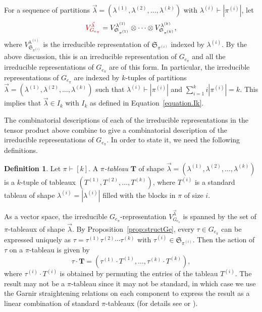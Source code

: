 \documentclass[10pt]{amsart}
\theoremstyle{definition}
\newtheorem{definition}[theorem]{Definition}
\theoremstyle{remark}
\newcommand{\defncolor}{\color{darkred}}
\newcommand{\defn}[1]{{\defncolor\emph{#1}}} %
\begin{document}
For a sequence of partitions
$\vec{\lambda} = (\lambda^{(1)}, \lambda^{(2)}, \ldots, \lambda^{(k)})$
with $\lambda^{(i)} \vdash |\pi^{(i)}|$,
let
\begin{equation*}
    {\defncolor V_{G_{e_\pi}}^{\vec{\lambda}}} =
    V_{\mathfrak{S}_{\pi^{(1)}}}^{\lambda^{(1)}}
    \otimes \cdots \otimes
    V_{\mathfrak{S}_{\pi^{(k)}}}^{\lambda^{(k)}},
\end{equation*}
where $V_{\mathfrak{S}_{\pi^{(i)}}}^{\lambda^{(i)}}$ is the irreducible
representation of $\mathfrak{S}_{\pi^{(i)}}$ indexed by $\lambda^{(i)}$.
By the above discussion, this is an irreducible representation of $G_{e_\pi}$
and all the irreducible representations of $G_{e_\pi}$ are of this form.
In particular, the irreducible representations of $G_{e_\pi}$ are indexed by
$k$-tuples of partitions
$\vec{\lambda} = (\lambda^{(1)}, \lambda^{(2)}, \ldots, \lambda^{(k)})$ such that
$\lambda^{(i)} \vdash |\pi^{(i)}|$ and $\sum_{i=1}^k i |\pi^{(i)}| = k$.
This implies that $\vec{\lambda}\in I_k$ with $I_k$ as defined in Equation~\eqref{equation.Ik}.

The combinatorial descriptions of each of the irreducible representations in
the tensor product above combine to give a combinatorial description of the
irreducible representations of $G_{e_\pi}$. In order to state it, we need the
following definitions.

\begin{definition}
Let $\pi \vdash [k]$.
A \defn{$\pi$-tableau} $\mathbf{T}$ of shape
$\vec{\lambda} = (\lambda^{(1)}, \lambda^{(2)}, \ldots, \lambda^{(k)})$
is a
$k$-tuple of tableaux $(T^{(1)}, T^{(2)}, \ldots, T^{(k)})$,
where  $T^{(i)}$ is a standard tableau of shape $\lambda^{(i)} = |\lambda^{(i)}|$
filled with the blocks in $\pi$ of size $i$.
\end{definition}

As a vector space, the irreducible $G_{e_\pi}$-representation
$V^{\vec{\lambda}}_{G_{e_\pi}}$ is spanned by the set of $\pi$-tableaux
of shape $\vec{\lambda}$.
By Proposition~\ref{prop:structGe},
every $\tau\in G_{e_\pi}$ can be expressed uniquely as $\tau = \tau^{(1)}
\tau^{(2)} \cdots  \tau^{(k)}$ with $\tau^{(i)} \in \mathfrak{S}_{\pi^{(i)}}$.
Then the action of $\tau$ on a $\pi$-tableau is given by
\begin{equation*}
    \tau \cdot \mathbf{T} = ( \tau^{(1)}\cdot T^{(1)}, \ldots, \tau^{(k)}\cdot T^{(k)}),
\end{equation*}
where $\tau^{(i)} \cdot T^{(i)}$ is obtained by permuting the entries of the tableau $T^{(i)}$.
The result may not be a $\pi$-tableau since it may not be standard,
in which case we use the Garnir straightening relations on each component
to express the result as a linear combination of standard $\pi$-tableaux
(for details see \cite[Section 2.6]{Sagan.2001} or \cite{CarreLascouxLeclerc}).
\end{document}
